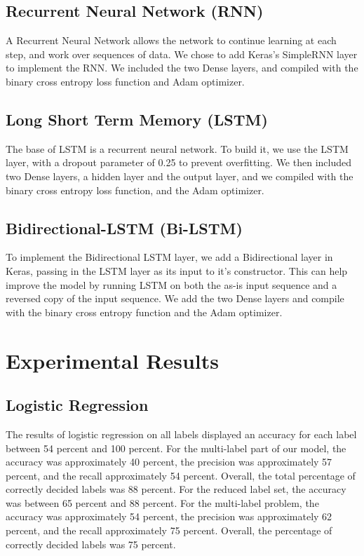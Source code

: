 \documentclass[sigconf]{acmart}
\begin{document}
\subsection{Recurrent Neural Network (RNN)}
A Recurrent Neural Network allows the network to continue learning at each step, and work over sequences of data. We chose to add Keras's SimpleRNN layer to implement the RNN. We included the two Dense layers, and compiled with the binary cross entropy loss function and Adam optimizer.

\subsection{Long Short Term Memory (LSTM)}
The base of LSTM is a recurrent neural network. To build it, we use the LSTM layer, with a dropout parameter of 0.25 to prevent overfitting. We then included two Dense layers, a hidden layer and the output layer, and we compiled with the binary cross entropy loss function, and the Adam optimizer.

\subsection{Bidirectional-LSTM (Bi-LSTM)}
To implement the Bidirectional LSTM layer, we add a Bidirectional layer in Keras, passing in the LSTM layer as its input to it's constructor. This can help improve the model by running LSTM on both the as-is input sequence and a reversed copy of the input sequence. We add the two Dense layers and compile with the binary cross entropy function and the Adam optimizer.

\section{Experimental Results}
\subsection{Logistic Regression}
The results of logistic regression on all labels displayed an accuracy for each label between 54 percent and 100 percent. For the multi-label part of our model, the accuracy was approximately 40 percent, the precision was approximately 57 percent, and the recall approximately 54 percent. Overall, the total percentage of correctly decided labels was 88 percent. For the reduced label set, the accuracy was between 65 percent and 88 percent. For the multi-label problem, the accuracy was approximately 54 percent, the precision was approximately 62 percent, and the recall approximately 75 percent. Overall, the percentage of correctly decided labels was 75 percent.
\end{document}
